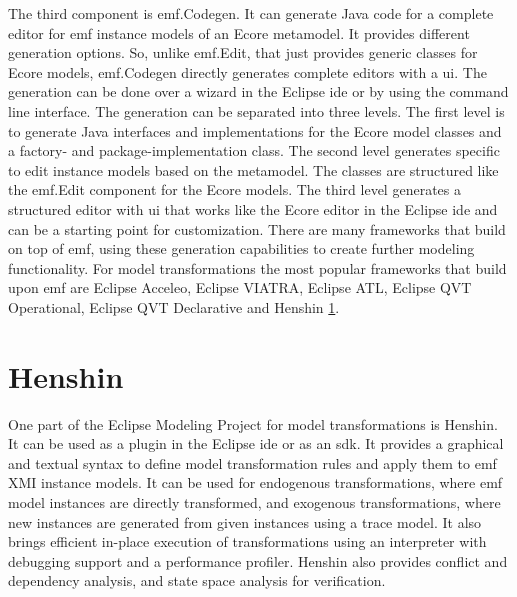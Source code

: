     The third component is \ac{emf}.Codegen. It can generate Java code for a complete editor for \ac{emf} instance models of an Ecore metamodel. It provides different generation options. So, unlike \ac{emf}.Edit, that just provides generic classes for Ecore models, \ac{emf}.Codegen directly generates complete editors with a \acs{ui}. \cite{eclipse_emf} The generation can be done over a wizard in the Eclipse \ac{ide} or by using the command line interface. \cite{emf} The generation can be separated into three levels. The first level is to generate Java interfaces and implementations for the Ecore model classes and a factory- and package-implementation class. The second level generates specific  to edit instance models based on the metamodel. The classes are structured like the \ac{emf}.Edit component for the Ecore models. The third level generates a structured editor with \acs{ui} that works like the Ecore editor in the Eclipse \ac{ide} and can be a starting point for customization. \cite{eclipse_emf} There are many frameworks that build on top of \ac{emf}, using these generation capabilities to create further modeling functionality. For model transformations the most popular frameworks that build upon \ac{emf} are Eclipse Acceleo, Eclipse VIATRA, Eclipse ATL, Eclipse QVT Operational, Eclipse QVT Declarative and Henshin \ref{subsec:henshin}.

  \section{Henshin}
  \label{subsec:henshin}

  One part of the Eclipse Modeling Project for model transformations is Henshin. It can be used as a plugin in the Eclipse \ac{ide} or as an \acs{sdk}. It provides a graphical and textual syntax to define model transformation rules and apply them to \ac{emf} XMI instance models. It can be used for endogenous transformations, where \ac{emf} model instances are directly transformed, and exogenous transformations, where new instances are generated from given instances using a trace model. It also brings efficient in-place execution of transformations using an interpreter with debugging support and a performance profiler. Henshin also provides conflict and dependency analysis, and state space analysis for verification. \cite{henshin-repo}

